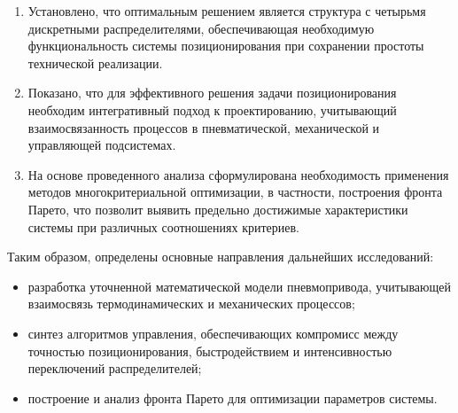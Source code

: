 \begin{enumerate}
	\item Установлено, что оптимальным решением является структура с
	      четырьмя дискретными распределителями, обеспечивающая необходимую
	      функциональность системы позиционирования при сохранении простоты
	      технической реализации.

	\item Показано, что для эффективного решения задачи позиционирования
	      необходим интегративный подход к проектированию, учитывающий
	      взаимосвязанность процессов в пневматической, механической и
	      управляющей подсистемах.

	\item На основе проведенного анализа сформулирована необходимость
	      применения методов многокритериальной оптимизации, в частности,
	      построения фронта Парето, что позволит выявить предельно достижимые
	      характеристики системы при различных соотношениях критериев.
\end{enumerate}

Таким образом, определены основные направления дальнейших исследований:
\begin{itemize}
	\item разработка уточненной математической модели пневмопривода,
	      учитывающей взаимосвязь термодинамических и механических процессов;
	\item синтез алгоритмов управления, обеспечивающих компромисс между
	      точностью позиционирования, быстродействием и интенсивностью переключений распределителей;
	\item построение и анализ фронта Парето для оптимизации параметров системы.
\end{itemize}